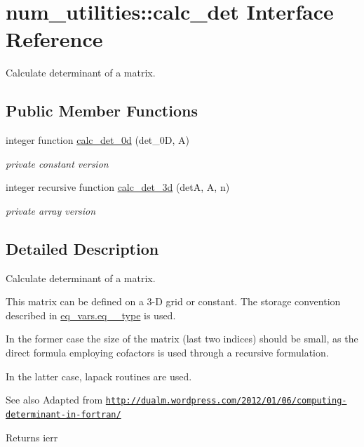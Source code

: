 \hypertarget{interfacenum__utilities_1_1calc__det}{}\section{num\+\_\+utilities\+:\+:calc\+\_\+det Interface Reference}
\label{interfacenum__utilities_1_1calc__det}


Calculate determinant of a matrix.  


\subsection*{Public Member Functions}
\begin{DoxyCompactItemize}
\item 
integer function \hyperlink{interfacenum__utilities_1_1calc__det_a2e4cb14f30a1269383252f02dd561523}{calc\+\_\+det\+\_\+0d} (det\+\_\+0D, A)
\begin{DoxyCompactList}\small\item\em private constant version \end{DoxyCompactList}\item 
integer recursive function \hyperlink{interfacenum__utilities_1_1calc__det_ae87e1d37bd74ff2915019d3a090a2ff8}{calc\+\_\+det\+\_\+3d} (detA, A, n)
\begin{DoxyCompactList}\small\item\em private array version \end{DoxyCompactList}\end{DoxyCompactItemize}


\subsection{Detailed Description}
Calculate determinant of a matrix. 

This matrix can be defined on a 3-\/D grid or constant. The storage convention described in \hyperlink{structeq__vars_1_1eq__2__type}{eq\+\_\+vars.\+eq\+\_\+\_\+type} is used.

In the former case the size of the matrix (last two indices) should be small, as the direct formula employing cofactors is used through a recursive formulation.

In the latter case, lapack routines are used.

\begin{DoxySeeAlso}{See also}
Adapted from \href{http://dualm.wordpress.com/2012/01/06/computing-determinant-in-fortran/}{\tt http\+://dualm.\+wordpress.\+com/2012/01/06/computing-\/determinant-\/in-\/fortran/}
\end{DoxySeeAlso}
\begin{DoxyReturn}{Returns}
ierr 
\end{DoxyReturn}


